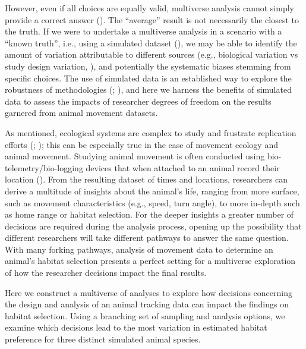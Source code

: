 \documentclass[10pt,a4paper]{article}
\begin{document}
However, even if all choices are equally valid, multiverse analysis cannot simply provide a correct answer ().
The ``average'' result is not necessarily the closest to the truth.
If we were to undertake a multiverse analysis in a scenario with a ``known truth'', i.e., using a simulated dataset (), we may be able to identify the amount of variation attributable to different sources (e.g., biological variation vs study design variation, ), and potentially the systematic biases stemming from specific choices.
The use of simulated data is an established way to explore the robustness of methodologies (; ), and here we harness the benefits of simulated data to assess the impacts of researcher degrees of freedom on the results garnered from animal movement datasets.

As mentioned, ecological systems are complex to study and frustrate replication efforts (; ); this can be especially true in the case of movement ecology and animal movement.
Studying animal movement is often conducted using bio-telemetry/bio-logging devices that when attached to an animal record their location ().
From the resulting dataset of times and locations, researchers can derive a multitude of insights about the animal's life, ranging from more surface, such as movement characteristics (e.g., speed, turn angle), to more in-depth such as home range or habitat selection.
For the deeper insights a greater number of decisions are required during the analysis process, opening up the possibility that different researchers will take different pathways to answer the same question.
With many forking pathways, analysis of movement data to determine an animal's habitat selection presents a perfect setting for a multiverse exploration of how the researcher decisions impact the final results.

Here we construct a multiverse of analyses to explore how decisions concerning the design and analysis of an animal tracking data can impact the findings on habitat selection.
Using a branching set of sampling and analysis options, we examine which decisions lead to the most variation in estimated habitat preference for three distinct simulated animal species.
\end{document}
